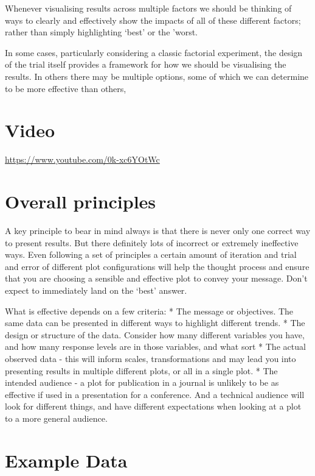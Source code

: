 \documentclass[
]{book}
\begin{document}
Whenever visualising results across multiple factors we should be thinking of ways to clearly and effectively show the impacts of all of these different factors; rather than simply highlighting `best' or the 'worst.

In some cases, particularly considering a classic factorial experiment, the design of the trial itself provides a framework for how we should be visualising the results. In others there may be multiple options, some of which we can determine to be more effective than others,

\hypertarget{video-1}{%
\section{Video}\label{video-1}}

\label{fig:unnamed-chunk-6}\url{https://www.youtube.com/0k-xc6YOtWc}

\hypertarget{overall-principles}{%
\section{Overall principles}\label{overall-principles}}

A key principle to bear in mind always is that there is never only one correct way to present results. But there definitely lots of incorrect or extremely ineffective ways. Even following a set of principles a certain amount of iteration and trial and error of different plot configurations will help the thought process and ensure that you are choosing a sensible and effective plot to convey your message. Don't expect to immediately land on the `best' answer.

What is effective depends on a few criteria:
* The message or objectives. The same data can be presented in different ways to highlight different trends.
* The design or structure of the data. Consider how many different variables you have, and how many response levels are in those variables, and what sort
* The actual observed data - this will inform scales, transformations and may lead you into presenting results in multiple different plots, or all in a single plot.
* The intended audience - a plot for publication in a journal is unlikely to be as effective if used in a presentation for a conference. And a technical audience will look for different things, and have different expectations when looking at a plot to a more general audience.

\hypertarget{example-data}{%
\section{Example Data}\label{example-data}}
\end{document}
